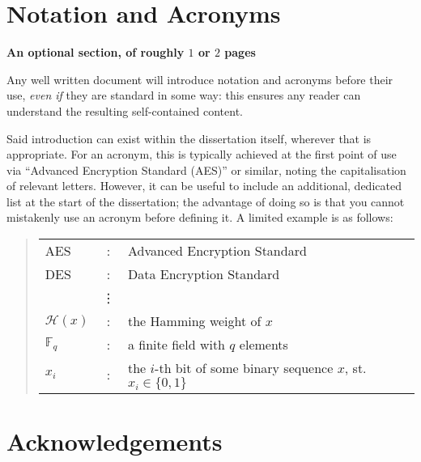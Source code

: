 \documentclass[ %
                    author={Callum Pearce},
                supervisor={Dr. Neill Campbell},
                    degree={MEng},
                     title={How effective are Temporal difference learning methods for reducing the number of zero contribution light paths while still accurately approximating Global Illumination in Path tracing?},
                  subtitle={},
                      type={research},
                      year={2019} ]{dissertation}
\begin{document}

\chapter*{Notation and Acronyms}

{\bf An optional section, of roughly $1$ or $2$ pages}
\vspace{1cm} 

\noindent
Any well written document will introduce notation and acronyms before
their use, {\em even if} they are standard in some way: this ensures 
any reader can understand the resulting self-contained content.  

Said introduction can exist within the dissertation itself, wherever 
that is appropriate.  For an acronym, this is typically achieved at 
the first point of use via ``Advanced Encryption Standard (AES)'' or 
similar, noting the capitalisation of relevant letters.  However, it 
can be useful to include an additional, dedicated list at the start 
of the dissertation; the advantage of doing so is that you cannot 
mistakenly use an acronym before defining it.  A limited example is 
as follows:

\begin{quote}
\noindent
\begin{tabular}{lcl}
AES                 &:     & Advanced Encryption Standard                                         \\
DES                 &:     & Data Encryption Standard                                             \\
                    &\vdots&                                                                      \\
${\mathcal H}( x )$ &:     & the Hamming weight of $x$                                            \\
${\mathbb  F}_q$    &:     & a finite field with $q$ elements                                     \\
$x_i$               &:     & the $i$-th bit of some binary sequence $x$, st. $x_i \in \{ 0, 1 \}$ \\
\end{tabular}
\end{quote}


\chapter*{Acknowledgements}
\end{document}

